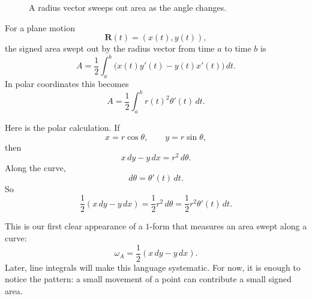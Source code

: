 \begin{figure}[h]
\centering
{}
\caption{A radius vector sweeps out area as the angle changes.}
\end{figure}

\begin{definition}
For a plane motion
\[
    \mathbf R(t)=(x(t),y(t)),
\]
the signed area swept out by the radius vector from time \(a\) to time \(b\) is
\[
\boxed{
    A=\frac12\int_a^b \bigl(x(t)y'(t)-y(t)x'(t)\bigr)\,dt.
}
\]
In polar coordinates this becomes
\[
\boxed{
    A=\frac12\int_a^b r(t)^2\theta'(t)\,dt.
}
\]
\end{definition}

Here is the polar calculation.  If
\[
    x=r\cos\theta,\qquad y=r\sin\theta,
\]
then
\[
    x\,dy-y\,dx=r^2\,d\theta.
\]
Along the curve,
\[
    d\theta=\theta'(t)\,dt.
\]
So
\[
    \frac12(x\,dy-y\,dx)
    =
    \frac12r^2\,d\theta
    =
    \frac12r^2\theta'(t)\,dt.
\]

This is our first clear appearance of a \(1\)-form that measures an area swept along a
curve:
\[
\boxed{
    \omega_A=\frac12(x\,dy-y\,dx).
}
\]
Later, line integrals will make this language systematic.  For now, it is enough to
notice the pattern: a small movement of a point can contribute a small signed area.

